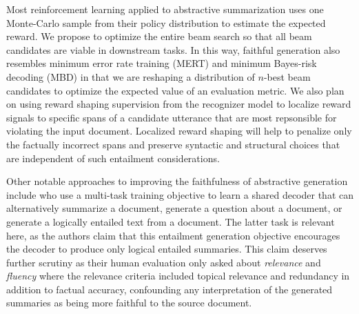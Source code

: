 Most reinforcement learning applied to abstractive summarization uses
one Monte-Carlo sample from their policy distribution to estimate the 
expected reward. We propose to optimize
the entire beam search so that all beam candidates are viable in downstream
tasks. In this way, faithful generation also resembles 
minimum error rate training (MERT) \citep{och2003minimum} 
and minimum Bayes-risk decoding (MBD)
\citep{kumar2004minimum} in that we are reshaping a distribution of $n$-best
beam candidates to optimize the expected value of an evaluation metric.
We also plan on using reward shaping supervision from the recognizer
model to localize reward signals \citep{mnih2014neural} to specific spans of 
a candidate utterance
that are most repsonsible for violating the input document. Localized
reward shaping will help to penalize only the factually incorrect spans
and preserve syntactic and structural choices that are independent of 
such entailment considerations.


Other notable approaches to improving the faithfulness of abstractive 
generation include \cite{guo2018soft} who use a multi-task training objective 
to learn a shared decoder that can alternatively summarize a document,
generate a question about a document, or generate a logically entailed text 
from a document.
The latter task is relevant here, as the authors claim that this entailment
generation objective encourages the decoder to produce only logical entailed
summaries. This claim deserves further scrutiny as their human 
evaluation only asked about \textit{relevance} and \textit{fluency} where
the relevance criteria included topical relevance and redundancy in addition
to factual accuracy, confounding any interpretation of the generated summaries
as being more faithful to the source document.







